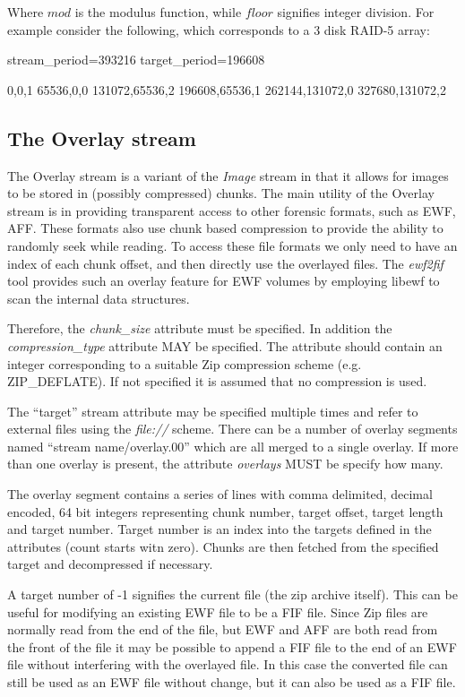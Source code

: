 \documentclass[12pt, conference]{IEEEtran}
\begin{document}
Where $mod$ is the modulus function, while $floor$ signifies integer
division. For example consider the following, which corresponds to a 3
disk RAID-5 array:
\begin{verbatim*}
stream_period=393216
target_period=196608

0,0,1
65536,0,0
131072,65536,2
196608,65536,1
262144,131072,0
327680,131072,2
\end{verbatim*}

\subsection{The Overlay stream}
The Overlay stream is a variant of the {\em Image} stream in that it
allows for images to be stored in (possibly compressed) chunks. The
main utility of the Overlay stream is in providing transparent access
to other forensic formats, such as EWF, AFF. These formats also use
chunk based compression to provide the ability to randomly seek while
reading. To access these file formats we only need to have an index of
each chunk offset, and then directly use the overlayed files. The {\em
ewf2fif} tool provides such an overlay feature for EWF volumes by
employing libewf to scan the internal data structures.

Therefore, the {\em chunk\_size} attribute must be specified. In
addition the {\em compression\_type} attribute MAY be specified. The
attribute should contain an integer corresponding to a suitable Zip
compression scheme (e.g. ZIP\_DEFLATE). If not specified it is assumed
that no compression is used.

The ``target'' stream attribute may be specified multiple times and
refer to external files using the {\em file://} scheme. There can be a
number of overlay segments named ``stream name/overlay.00'' which are
all merged to a single overlay. If more than one overlay is present,
the attribute {\em overlays} MUST be specify how many.

The overlay segment contains a series of lines with comma delimited,
decimal encoded, 64 bit integers representing chunk number, target
offset, target length and target number. Target number is an index
into the targets defined in the attributes (count starts witn zero).
Chunks are then fetched from the specified target and decompressed if
necessary.

A target number of -1 signifies the current file (the zip archive
itself). This can be useful for modifying an existing EWF file to be a
FIF file. Since Zip files are normally read from the end of the file,
but EWF and AFF are both read from the front of the file it may be
possible to append a FIF file to the end of an EWF file without
interfering with the overlayed file. In this case the converted file
can still be used as an EWF file without change, but it can also be
used as a FIF file.
\end{document}
